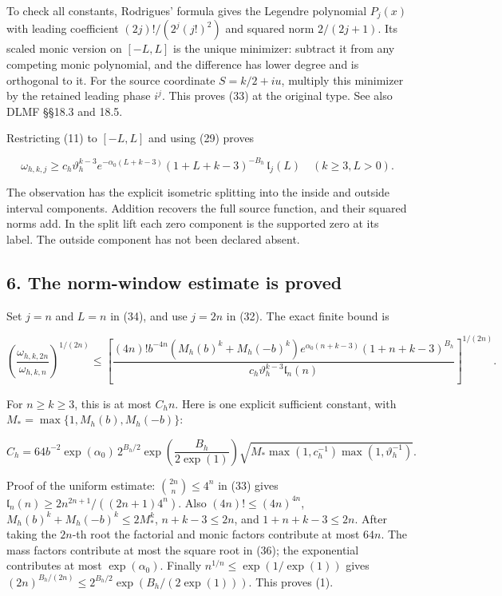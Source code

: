 To check all constants, Rodrigues' formula gives the Legendre polynomial \(P_j(x)\) with leading coefficient \((2j)!/(2^j(j!)^2)\) and squared norm \(2/(2j+1)\). Its scaled monic version on \([-L,L]\) is the unique minimizer: subtract it from any competing monic polynomial, and the difference has lower degree and is orthogonal to it. For the source coordinate \(S=k/2+iu\), multiply this minimizer by the retained leading phase \(i^j\). This proves (33) at the original type. See also DLMF §§18.3 and 18.5.

Restricting (11) to \([-L,L]\) and using (29) proves

\[
 \boxed{
 \omega_{h,k,j}\ge
 c_h\vartheta_h^{k-3}
 e^{-\alpha_0(L+k-3)}(1+L+k-3)^{-B_h}\,\mathfrak l_j(L)
 \quad(k\ge3,L>0).}                                                    \tag{34}
\]

The observation has the explicit isometric splitting into the inside and outside interval components. Addition recovers the full source function, and their squared norms add. In the split lift each zero component is the supported zero at its label. The outside component has not been declared absent.

\subsection{6. The norm-window estimate is proved}\label{zlm:endpoint-arithmetic_original--the-norm-window-estimate-is-proved}

Set \(j=n\) and \(L=n\) in (34), and use \(j=2n\) in (32). The exact finite bound is

\[
 \boxed{
 \left(\frac{\omega_{h,k,2n}}{\omega_{h,k,n}}\right)^{1/(2n)}
 \le\left[
 \frac{(4n)!b^{-4n}(M_h(b)^k+M_h(-b)^k)
       e^{\alpha_0(n+k-3)}(1+n+k-3)^{B_h}}
      {c_h\vartheta_h^{k-3}\mathfrak l_n(n)}
       \right]^{1/(2n)}.}                                              \tag{35}
\]

For \(n\ge k\ge3\), this is at most \(C_hn\). Here is one explicit sufficient constant, with \(M_* =\max\{1,M_h(b),M_h(-b)\}\):

\[
 \boxed{
 C_h=64b^{-2}\exp(\alpha_0)\,2^{B_h/2}
       \exp\!\left(\frac{B_h}{2\exp(1)}\right)
       \sqrt{M_*\max(1,c_h^{-1})\max(1,\vartheta_h^{-1})}.
 }                                                                     \tag{36}
\]

Proof of the uniform estimate: \(\binom{2n}{n}\le4^n\) in (33) gives \(\mathfrak l_n(n)\ge2n^{2n+1}/((2n+1)4^n)\). Also \((4n)!\le(4n)^{4n}\), \(M_h(b)^k+M_h(-b)^k\le2M_*^k\), \(n+k-3\le2n\), and \(1+n+k-3\le2n\). After taking the \(2n\)-th root the factorial and monic factors contribute at most \(64n\). The mass factors contribute at most the square root in (36); the exponential contributes at most \(\exp(\alpha_0)\). Finally \(n^{1/n}\le\exp(1/\exp(1))\) gives \((2n)^{B_h/(2n)}\le2^{B_h/2}\exp(B_h/(2\exp(1)))\). This proves (1).

